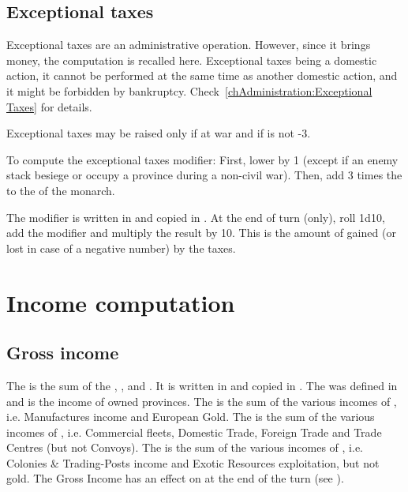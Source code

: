 \subsection{Exceptional taxes}\label{chIncomes:Exceptional Taxes}
\aparag Exceptional taxes are an administrative operation. However,
since it brings money, the computation is recalled here.
\bparag Exceptional taxes being a domestic action, it cannot be
performed at the same time as another domestic action, and it might be
forbidden by bankruptcy.
\bparag Check~\ref{chAdministration:Exceptional Taxes} for details.

\aparag Exceptional taxes may be raised only if at war and if \STAB is
not -3.

\aparag[Summary.] To compute the exceptional taxes modifier:
\bparag First, lower \STAB by 1 (except if an enemy stack besiege or
occupy a province during a non-civil war).
\bparag Then, add 3 times the \STAB to the \ADM of the monarch.

\aparag The modifier is written in  and copied in .
\bparag At the end of turn (only), roll 1d10, add the modifier and
multiply the result by 10.
\bparag This is the amount of \ducats gained (or lost in case of a
negative number) by the taxes.

\section{Income computation}\label{chIncomes:Summary}
\subsection{Gross income}
\aparag The  is the sum of the ,
,  and . It is written in  and copied in
.
\bparag The  was defined in
 and is the income of owned provinces.
\bparag The  is the sum of the various incomes
of , i.e. Manufactures income and European
Gold.
\bparag The  is the sum of the various incomes of
, i.e. Commercial fleets, Domestic Trade,
Foreign Trade and Trade Centres (but not Convoys).
\bparag The  is the sum of the various incomes of
, i.e. Colonies \& Trading-Posts income and
Exotic Resources exploitation, but not \ROTW gold.
\bparag[Stability] The Gross Income has an effect on \STAB at the end of
the turn (see ).

